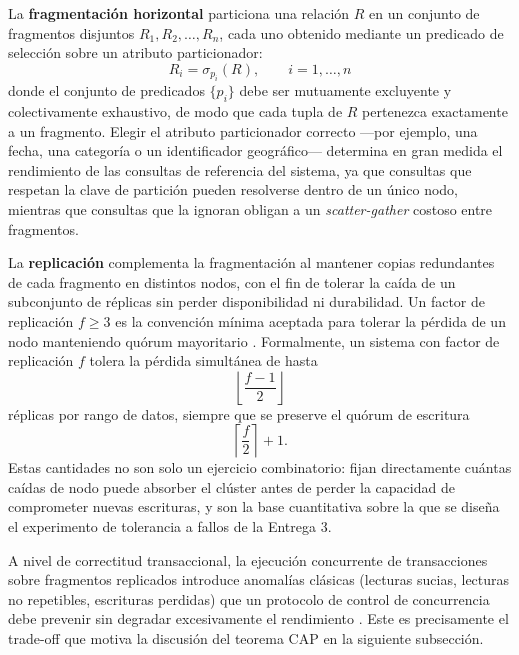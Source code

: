 \documentclass[12pt]{article}
\begin{document}
    La \textbf{fragmentación horizontal} particiona una relación $R$ en un conjunto de fragmentos disjuntos $R_1, R_2, \dots, R_n$, cada uno obtenido mediante un predicado de selección sobre un atributo particionador:
    \begin{equation}
        R_i = \sigma_{p_i}(R), \qquad i = 1, \dots, n
        \label{eq:fragmentacion}
    \end{equation}
    donde el conjunto de predicados $\{p_i\}$ debe ser mutuamente excluyente y colectivamente exhaustivo, de modo que cada tupla de $R$ pertenezca exactamente a un fragmento. Elegir el atributo particionador correcto —por ejemplo, una fecha, una categoría o un identificador geográfico— determina en gran medida el rendimiento de las consultas de referencia del sistema, ya que consultas que respetan la clave de partición pueden resolverse dentro de un único nodo, mientras que consultas que la ignoran obligan a un \emph{scatter-gather} costoso entre fragmentos.

    La \textbf{replicación} complementa la fragmentación al mantener copias redundantes de cada fragmento en distintos nodos, con el fin de tolerar la caída de un subconjunto de réplicas sin perder disponibilidad ni durabilidad. Un factor de replicación $f \geq 3$ es la convención mínima aceptada para tolerar la pérdida de un nodo manteniendo quórum mayoritario \parencite{ongaro2014raft, taft2020cockroachdb}. Formalmente, un sistema con factor de replicación $f$ tolera la pérdida simultánea de hasta
    \begin{equation}
        \left\lfloor \frac{f-1}{2} \right\rfloor
        \label{eq:tolerancia}
    \end{equation}
    réplicas por rango de datos, siempre que se preserve el quórum de escritura
    \begin{equation}
        \left\lceil \frac{f}{2} \right\rceil + 1 .
        \label{eq:quorum}
    \end{equation}
    Estas cantidades no son solo un ejercicio combinatorio: fijan directamente cuántas caídas de nodo puede absorber el clúster antes de perder la capacidad de comprometer nuevas escrituras, y son la base cuantitativa sobre la que se diseña el experimento de tolerancia a fallos de la Entrega 3.

    A nivel de correctitud transaccional, la ejecución concurrente de transacciones sobre fragmentos replicados introduce anomalías clásicas (lecturas sucias, lecturas no repetibles, escrituras perdidas) que un protocolo de control de concurrencia debe prevenir sin degradar excesivamente el rendimiento \parencite{hasan2024concurrency}. Este es precisamente el trade-off que motiva la discusión del teorema CAP en la siguiente subsección.
\end{document}
